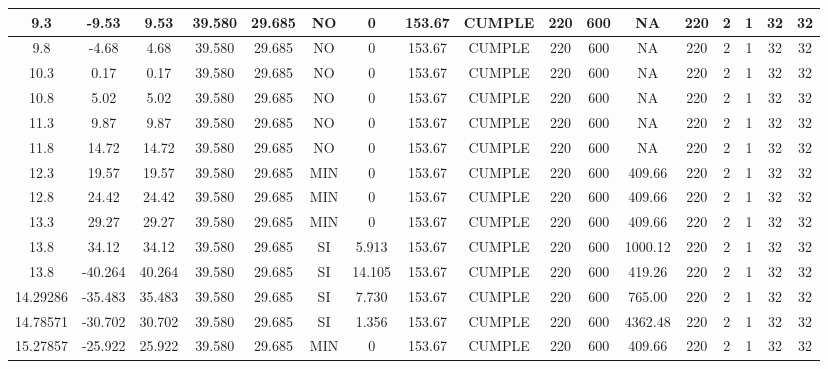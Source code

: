 \begin{table}[h]
{\begin{tabular}{|c|c|c|c|c|c|c|c|c|c|c|c|c|c|c|c|c|}
    \hline
    9.3 & -9.53 & 9.53 & 39.580 & 29.685 & NO  & 0   & 153.67 & CUMPLE & 220 & 600 & NA  & 220 & 2   & 1   & 32  & 32 \bigstrut\\
    \hline
    9.8 & -4.68 & 4.68 & 39.580 & 29.685 & NO  & 0   & 153.67 & CUMPLE & 220 & 600 & NA  & 220 & 2   & 1   & 32  & 32 \bigstrut\\
    \hline
    10.3 & 0.17 & 0.17 & 39.580 & 29.685 & NO  & 0   & 153.67 & CUMPLE & 220 & 600 & NA  & 220 & 2   & 1   & 32  & 32 \bigstrut\\
    \hline
    10.8 & 5.02 & 5.02 & 39.580 & 29.685 & NO  & 0   & 153.67 & CUMPLE & 220 & 600 & NA  & 220 & 2   & 1   & 32  & 32 \bigstrut\\
    \hline
    11.3 & 9.87 & 9.87 & 39.580 & 29.685 & NO  & 0   & 153.67 & CUMPLE & 220 & 600 & NA  & 220 & 2   & 1   & 32  & 32 \bigstrut\\
    \hline
    11.8 & 14.72 & 14.72 & 39.580 & 29.685 & NO  & 0   & 153.67 & CUMPLE & 220 & 600 & NA  & 220 & 2   & 1   & 32  & 32 \bigstrut\\
    \hline
    12.3 & 19.57 & 19.57 & 39.580 & 29.685 & MIN & 0   & 153.67 & CUMPLE & 220 & 600 & 409.66 & 220 & 2   & 1   & 32  & 32 \bigstrut\\
    \hline
    12.8 & 24.42 & 24.42 & 39.580 & 29.685 & MIN & 0   & 153.67 & CUMPLE & 220 & 600 & 409.66 & 220 & 2   & 1   & 32  & 32 \bigstrut\\
    \hline
    13.3 & 29.27 & 29.27 & 39.580 & 29.685 & MIN & 0   & 153.67 & CUMPLE & 220 & 600 & 409.66 & 220 & 2   & 1   & 32  & 32 \bigstrut\\
    \hline
    13.8 & 34.12 & 34.12 & 39.580 & 29.685 & SI  & 5.913 & 153.67 & CUMPLE & 220 & 600 & 1000.12 & 220 & 2   & 1   & 32  & 32 \bigstrut\\
    \hline
    13.8 & -40.264 & 40.264 & 39.580 & 29.685 & SI  & 14.105 & 153.67 & CUMPLE & 220 & 600 & 419.26 & 220 & 2   & 1   & 32  & 32 \bigstrut\\
    \hline
    14.29286 & -35.483 & 35.483 & 39.580 & 29.685 & SI  & 7.730 & 153.67 & CUMPLE & 220 & 600 & 765.00 & 220 & 2   & 1   & 32  & 32 \bigstrut\\
    \hline
    14.78571 & -30.702 & 30.702 & 39.580 & 29.685 & SI  & 1.356 & 153.67 & CUMPLE & 220 & 600 & 4362.48 & 220 & 2   & 1   & 32  & 32 \bigstrut\\
    \hline
    15.27857 & -25.922 & 25.922 & 39.580 & 29.685 & MIN & 0   & 153.67 & CUMPLE & 220 & 600 & 409.66 & 220 & 2   & 1   & 32  & 32 \bigstrut\\

\end{tabular}}
\end{table}
